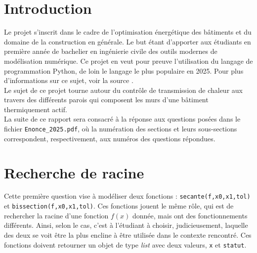 \documentclass[12pt]{article}
\begin{document}
\sloppy %




\renewcommand{\contentsname}{Table des matières}
\renewcommand{\listfigurename}{Table des figures}
\renewcommand{\listtablename}{Liste des tableaux}

\tableofcontents
\newpage
\listoffigures
\listoftables
\newpage


\renewcommand\thesection{0} %
\section{Introduction}

Le projet s'inscrit dans le cadre de l'optimisation énergétique des bâtiments et du domaine de la construction en générale. Le but étant d'apporter aux étudiants en première année de bachelier en ingénierie civile des outils modernes de modélisation numérique. Ce projet en veut pour preuve l'utilisation du langage de programmation Python, de loin le langage le plus populaire en 2025. Pour plus d'informations sur ce sujet, voir la source \cite{Tiobe2025}. \\
Le sujet de ce projet tourne autour du contrôle de transmission de chaleur aux travers des différents parois qui composent les murs d'une bâtiment thermiquement actif. \\
La suite de ce rapport sera consacré à la réponse aux questions posées dans le fichier \texttt{Enonce\_2025.pdf}, où la numération des sections et leurs sous-sections correspondent, respectivement, aux numéros des questions répondues.

\renewcommand\thesection{\arabic{section}} %
\setcounter{section}{0} %

\section{Recherche de racine}

Cette première question vise à modéliser deux fonctions : \texttt{secante(f,x0,x1,tol)} et \texttt{bissection(f,x0,x1,tol)}. Ces fonctions jouent le même rôle, qui est de rechercher la racine d'une fonction $f(x)$ donnée, mais ont des fonctionnements différents. Ainsi, selon le cas, c'est à l'étudiant à choisir, judicieusement, laquelle des deux se voit être la plus encline à être utilisée dans le contexte rencontré. Ces fonctions doivent retourner un objet de type \textit{list} avec deux valeurs, \texttt{x} et \texttt{statut}.
\end{document}
